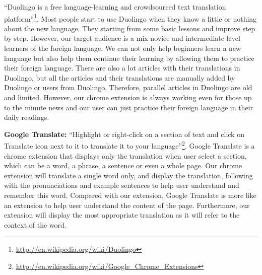 ``Duolingo is a free language-learning and crowdsourced text translation 
platform''\footnote{\url{http://en.wikipedia.org/wiki/Duolingo}}.
Most people start to use Duolingo when they know a little or nothing about 
the new language. They starting from some basic lessons and improve step by step.
However, our target audience 
is a mix novice and intermediate level learners of the foreign language. 
We can not only help beginners learn 
a new language but also help them continue their learning by allowing them to practice 
their foreign language. There are also a lot articles with their translations in 
Duolingo, but all the articles and their translations are manually added by 
Duolingo or users from Duolingo. Therefore, parallel articles in Duolingo are old and 
limited. However, our chrome extension is always working even for those up to the 
minute news and our user can just practice their foreign language in their daily 
readings.

\textbf{Google Translate:} ``Highlight or right-click on a section of text and click
on Translate icon next to it to translate it to your 
language''\footnote{\url{http://en.wikipedia.org/wiki/Google_Chrome_Extensions}}. 
Google Translate is a chrome extension that displays only the translation when user 
select a section, which can be a word, a phrase, a sentence or even a whole page. 
Our chrome extension will translate a single word only, and display the translation,
following with the pronunciations and example sentences to help user understand and 
remember this word. Compared with our extension, Google Translate is more like an extension 
to help user understand the content of the page. Furthermore, our extension will display 
the most appropriate translation as it will refer to the context of the word.


